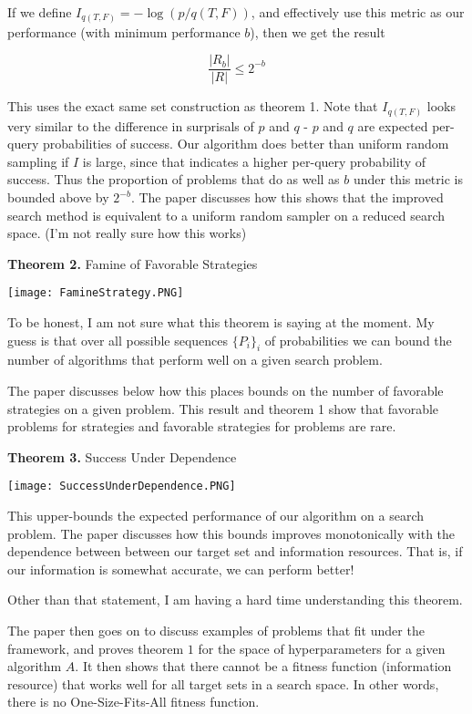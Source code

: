 \documentclass[12pt]{article}
\begin{document}
If we define $I_{q(T,F)} = - \log(p/q(T,F))$, and effectively use this metric as our performance (with minimum performance $b$), then we get the result 

\[\frac{|R_b|}{|R|} \leq 2^{-b}\]

This uses the exact same set construction as theorem 1. Note that $I_{q(T,F)}$ looks very similar to the difference in surprisals of $p$ and $q$ - $p$ and $q$ are expected per-query probabilities of success. Our algorithm does better than uniform random sampling if $I$ is large, since that indicates a higher per-query probability of success. Thus the proportion of problems that do as well as $b$ under this metric is bounded above by $2^{-b}$. The paper discusses how this shows that the improved search method is equivalent to a uniform random sampler on a reduced search space. (I'm not really sure how this works) 

\bigskip

\textbf{Theorem 2.} Famine of Favorable Strategies
\begin{center}
    \texttt{[image: FamineStrategy.PNG]}
\end{center}

To be honest, I am not sure what this theorem is saying at the moment. My guess is that over all possible sequences $\{P_i\}_i$ of probabilities we can bound the number of algorithms that perform well on a given search problem. 

The paper discusses below how this places bounds on the number of favorable strategies on a given problem. This result and theorem 1 show that favorable problems for strategies and favorable strategies for problems are rare. 

\bigskip

\textbf{Theorem 3.} Success Under Dependence
\begin{center}
    \texttt{[image: SuccessUnderDependence.PNG]}
\end{center}

This upper-bounds the expected performance of our algorithm on a search problem. The paper discusses how this bounds improves monotonically with the dependence between between our target set and information resources. That is, if our information is somewhat accurate, we can perform better! 

Other than that statement, I am having a hard time understanding this theorem. 


\bigskip

The paper then goes on to discuss examples of problems that fit under the framework, and proves theorem $1$ for the space of hyperparameters for a given algorithm $A$. It then shows that there cannot be a fitness function (information resource) that works well for all target sets in a search space. In other words, there is no One-Size-Fits-All fitness function. 
\end{document}

